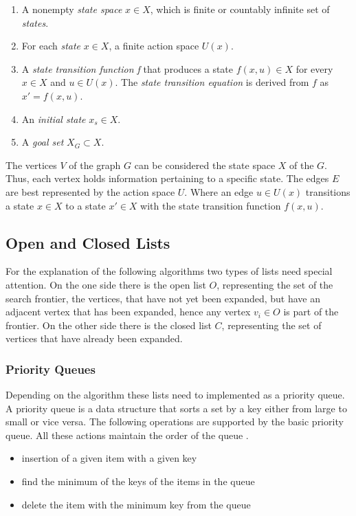 \begin{enumerate}
    \item A nonempty \textit{state space} $x \in X$, which is finite or countably infinite set of \textit{states}.
    \item For each \textit{state} $x \in X$, a finite action space $U(x)$.
    \item A \textit{state transition function f} that produces a state $f(x,u) \in X$ for every $x \in X$ and $u \in U(x)$. The \textit{state transition equation} is derived from $f$ as $x' = f(x,u)$.
    \item An \textit{initial state} $x_s \in X$.
    \item A \textit{goal set} $X_G \subset X$.
\end{enumerate}

The vertices $V$ of the graph $G$ can be considered the state space $X$ of the $G$. Thus, each vertex holds information pertaining to a specific state. The edges $E$ are best represented by the action space $U$. Where an edge $u \in U(x)$ transitions a state $x \in X$ to a state $x' \in X$ with the state transition function $f(x,u)$.

\subsection{Open and Closed Lists}
For the explanation of the following algorithms two types of lists need special attention. On the one side there is the open list $O$, representing the set of the search frontier, the vertices, that have not yet been expanded, but have an adjacent vertex that has been expanded, hence any vertex $v_i \in O$ is part of the frontier. On the other side there is the closed list $C$, representing the set of vertices that have already been expanded.

\subsubsection{Priority Queues}
Depending on the algorithm these lists need to implemented as a priority queue. A priority queue is a data structure that sorts a set by a key either from large to small or vice versa. The following operations are supported by the basic priority queue. All these actions maintain the order of the queue \cite{Skiena.2008}.

\begin{itemize}
    \item insertion of a given item with a given key
    \item find the minimum of the keys of the items in the queue
    \item delete the item with the minimum key from the queue
\end{itemize}

